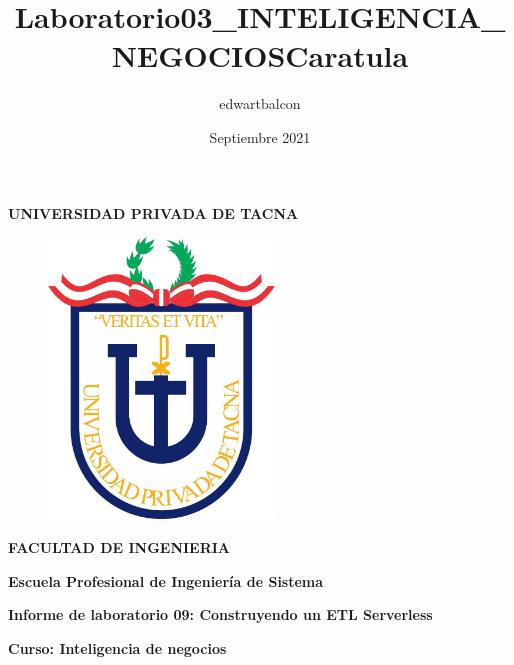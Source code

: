 \documentclass{article}
\title{Laboratorio03_INTELIGENCIA_NEGOCIOS}
\author{edwartbalcon}
\date{Septiembre 2021}
\begin{document}
\title{Caratula}

\begin{titlepage}
\begin{center}
\begin{Large}
\textbf{UNIVERSIDAD PRIVADA DE TACNA} \\
\end{Large}
\vspace*{-0.025in}
\begin{figure}[htb]
\begin{center}
\includegraphics[width=6cm]{./images/logo_UPT}
\end{center}
\end{figure}
\vspace*{-0.025in}
\begin{Large}
\textbf{FACULTAD DE INGENIERIA} \\
\end{Large}
\vspace*{0.05in}
\begin{Large}
\textbf{Escuela Profesional de Ingeniería de Sistema} \\
\end{Large}


\vspace*{0.4in}

\vspace*{0.1in}
\begin{Large}
\textbf{Informe de laboratorio 09: Construyendo un ETL
Serverless} \\
\end{Large}

\vspace*{0.3in}
\begin{Large}
\textbf{Curso: Inteligencia de negocios} \\
\end{Large}


\end{center}
\end{titlepage}
\end{document}

